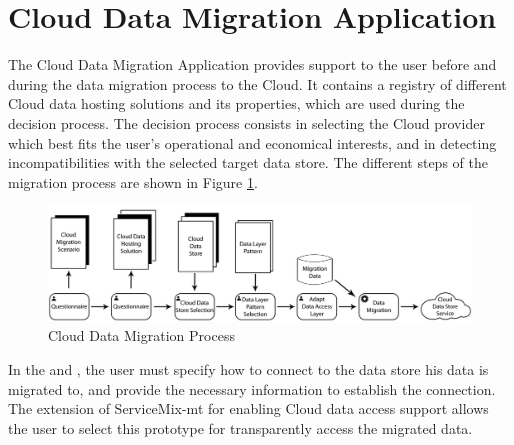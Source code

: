 \section{Cloud Data Migration Application}
\label{sec:clouddatamigrationtool}  

The Cloud Data Migration Application provides support to the user before and during the data migration process to the Cloud. It contains a registry of different Cloud data hosting solutions and its properties, which are used during the decision process. The decision process consists in selecting the Cloud provider which best fits the user's operational and economical interests, and in detecting incompatibilities with the selected target data store. The different steps of the migration process are shown in Figure \ref{fig:cloudmigrateapp}. 

\begin{figure}[htb]
	\centering
		\includegraphics[clip, scale=0.4]{./gfx/clouddatamigrationtool.png}
	\caption[Cloud Data Migration Application - Cloud Data Migration Process]{Cloud Data Migration Process \cite{bachmann2012}} 
	\label{fig:cloudmigrateapp}
\end{figure}

In the  and , the user must specify how to connect to the data store his data is migrated to, and provide the necessary information to establish the connection. The extension of ServiceMix-mt for enabling Cloud data access support allows the user to select this prototype for transparently access the migrated data. 

\FloatBarrier